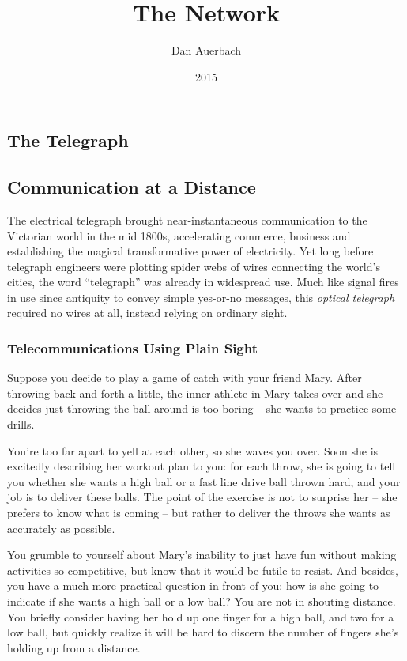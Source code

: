 \documentclass[UTF8]{book}
\begin{document}
\begin{CJK}{UTF8}{gbsn}

\title{The Network}
\author{Dan Auerbach}
\date{2015}
\maketitle


\part{The Telegraph}

\chapter{Communication at a Distance}

The electrical telegraph brought near-instantaneous communication to the Victorian world in the mid 1800s, accelerating commerce, business and establishing the magical transformative power of electricity. Yet long before telegraph engineers were plotting spider webs of wires connecting the world's cities, the word ``telegraph'' was already in widespread use. Much like signal fires in use since antiquity to convey simple yes-or-no messages, this \emph{optical telegraph} required no wires at all, instead relying on ordinary sight.

\section{Telecommunications Using Plain Sight}

Suppose you decide to play a game of catch with your friend Mary. After throwing back and forth a little, the inner athlete in Mary takes over and she decides just throwing the ball around is too boring -- she wants to practice some drills.

You're too far apart to yell at each other, so she waves you over. Soon she is excitedly describing her workout plan to you: for each throw, she is going to tell you whether she wants a high ball or a fast line drive ball thrown hard, and your job is to deliver these balls. The point of the exercise is not to surprise her -- she prefers to know what is coming -- but rather to deliver the throws she wants as accurately as possible.

You grumble to yourself about Mary's inability to just have fun without making activities so competitive, but know that it would be futile to resist. And besides, you have a much more practical question in front of you: how is she going to indicate if she wants a high ball or a low ball? You are not in shouting distance. You briefly consider having her hold up one finger for a high ball, and two for a low ball, but quickly realize it will be hard to discern the number of fingers she's holding up from a distance.


\end{CJK}
\end{document}
